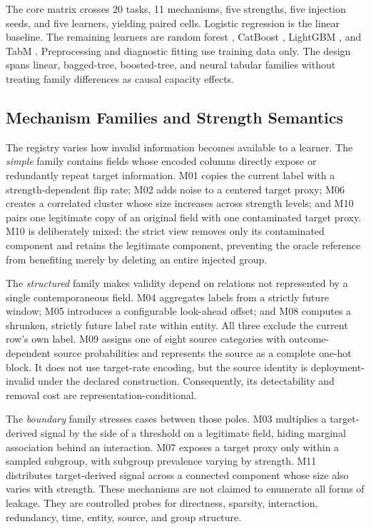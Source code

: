 \documentclass[sigconf,review]{acmart}
\begin{document}
\begin{sloppypar}
The core matrix crosses 20 tasks, 11 mechanisms, five strengths, five
injection seeds, and five learners, yielding \CoreCellCount{} paired cells.
Logistic regression is the linear baseline. The remaining learners are random
forest \cite{breiman2001random}, CatBoost \cite{prokhorenkova2018catboost},
LightGBM \cite{ke2017lightgbm}, and TabM \cite{gorishniy2025tabm}.
Preprocessing and diagnostic fitting use training data only. The design spans
linear, bagged-tree, boosted-tree, and neural tabular families without treating
family differences as causal capacity effects.
\end{sloppypar}

\subsection{Mechanism Families and Strength Semantics}

The registry varies how invalid information becomes available to a learner.
The \emph{simple} family contains fields whose encoded columns directly expose
or redundantly repeat target information. M01 copies the current label with a
strength-dependent flip rate; M02 adds noise to a centered target proxy; M06
creates a correlated cluster whose size increases across strength levels; and
M10 pairs one legitimate copy of an original field with one contaminated
target proxy. M10 is deliberately mixed: the strict view removes only its
contaminated component and retains the legitimate component, preventing the
oracle reference from benefiting merely by deleting an entire injected group.

The \emph{structured} family makes validity depend on relations not represented
by a single contemporaneous field. M04 aggregates labels from a strictly future
window; M05 introduces a configurable look-ahead offset; and M08 computes a
shrunken, strictly future label rate within entity. All three exclude the
current row's own label. M09 assigns one of eight source categories with
outcome-dependent source probabilities and represents the source as a complete
one-hot block. It does not use target-rate encoding, but the source identity is
deployment-invalid under the declared construction. Consequently, its
detectability and removal cost are representation-conditional.

The \emph{boundary} family stresses cases between those poles. M03 multiplies
a target-derived signal by the side of a threshold on a legitimate field,
hiding marginal association behind an interaction. M07 exposes a target proxy
only within a sampled subgroup, with subgroup prevalence varying by strength.
M11 distributes target-derived signal across a connected component whose size
also varies with strength. These mechanisms are not claimed to enumerate all
forms of leakage. They are controlled probes for directness, sparsity,
interaction, redundancy, time, entity, source, and group structure.
\end{document}
